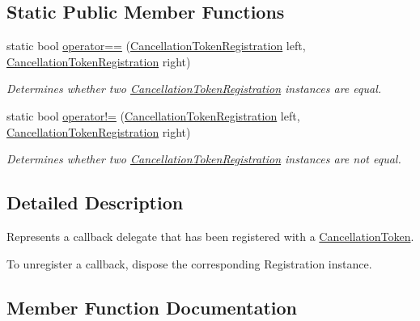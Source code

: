 \subsection*{Static Public Member Functions}
\begin{DoxyCompactItemize}
\item 
static bool \hyperlink{struct_system_1_1_threading_1_1_cancellation_token_registration_ae0b6b71e049bef0ebcceeecbed95e3d8}{operator==} (\hyperlink{struct_system_1_1_threading_1_1_cancellation_token_registration}{Cancellation\+Token\+Registration} left, \hyperlink{struct_system_1_1_threading_1_1_cancellation_token_registration}{Cancellation\+Token\+Registration} right)
\begin{DoxyCompactList}\small\item\em Determines whether two \hyperlink{}{Cancellation\+Token\+Registration} instances are equal. \end{DoxyCompactList}\item 
static bool \hyperlink{struct_system_1_1_threading_1_1_cancellation_token_registration_a5a456b2e65d092cd851914c0947104ef}{operator!=} (\hyperlink{struct_system_1_1_threading_1_1_cancellation_token_registration}{Cancellation\+Token\+Registration} left, \hyperlink{struct_system_1_1_threading_1_1_cancellation_token_registration}{Cancellation\+Token\+Registration} right)
\begin{DoxyCompactList}\small\item\em Determines whether two \hyperlink{}{Cancellation\+Token\+Registration} instances are not equal. \end{DoxyCompactList}\end{DoxyCompactItemize}


\subsection{Detailed Description}
Represents a callback delegate that has been registered with a \hyperlink{}{Cancellation\+Token}. 

To unregister a callback, dispose the corresponding Registration instance. 

\subsection{Member Function Documentation}
\mbox{\label{struct_system_1_1_threading_1_1_cancellation_token_registration_a7dfceaa1ee61cd0a5ee49879cc4e43d7}} 
